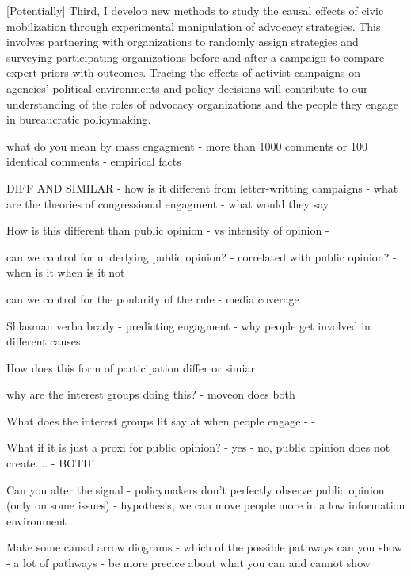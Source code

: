 [Potentially] Third, I develop new methods to study the causal effects of civic mobilization through experimental manipulation of advocacy strategies. This involves partnering with organizations to randomly assign strategies and surveying participating organizations before and after a campaign to compare expert priors with outcomes. 
Tracing the effects of activist campaigns on agencies' political environments and policy decisions will contribute to our understanding of the roles of advocacy organizations and the people they engage in bureaucratic policymaking. 



what do you mean by mass engagment 
- more than 1000 comments or 100 identical comments 
- empirical facts 

DIFF AND SIMILAR 
- how is it different from letter-writting campaigns 
- what are the theories of congressional engagment - what would they say

How is this different than public opinion 
- vs intensity of opinion 
- 

can we control for underlying public opinion? 
- correlated with public opinion? 
- when is it when is it not 

can we control for the poularity of the rule 
- media coverage

Shlasman verba brady 
- predicting engagment 
- why people get involved in different causes 

How does this form of participation differ or simiar

why are the interest groups doing this? 
- moveon does both 

What does the interest groups lit say at when people engage 
- 
- 

What if it is just a proxi for public opinion? 
- yes
- no, public opinion does not create....
- BOTH! 

Can you alter the signal
- policymakers don't perfectly observe public opinion (only on some issues) 
- hypothesis, we can move people more in a low information environment


Make some causal arrow diograms 
- which of the possible pathways can you show 
- a lot of pathways 
- be more precice about what you can and cannot show


